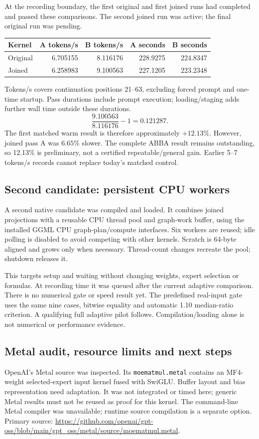 At the recording boundary, the first original and first joined runs had
completed and passed these comparisons. The second joined run was active;
the final original run was pending.
\begin{center}
\begin{tabular}{lrrrr}
\toprule
Kernel & A tokens/s & B tokens/s & A seconds & B seconds \\
\midrule
Original & 6.705155 & 8.116176 & 228.9275 & 224.8347 \\
Joined & 6.258983 & 9.100563 & 227.1205 & 223.2348 \\
\bottomrule
\end{tabular}
\end{center}
Tokens/s covers continuation positions 21--63, excluding forced prompt and
one-time startup. Pass durations include prompt execution; loading/staging
adds further wall time outside these durations.
\[
 \frac{9.100563}{8.116176}-1=0.121287.
\]
The first matched warm result is therefore approximately $+12.13\%$.
However, joined pass A was $6.65\%$ slower. The complete ABBA result remains
outstanding, so 12.13\% is preliminary, not a certified repeatable/general
gain. Earlier 5--7 tokens/s records cannot replace today's matched control.

\subsection{Second candidate: persistent CPU workers}
A second native candidate was compiled and loaded. It combines joined
projections with a reusable CPU thread pool and graph-work buffer, using
the installed GGML CPU graph-plan/compute interfaces. Six workers are reused;
idle polling is disabled to avoid competing with other kernels. Scratch
is 64-byte aligned and grows only when necessary. Thread-count changes
recreate the pool; shutdown releases it.

This targets setup and waiting without changing weights, expert selection
or formulas. At recording time it was queued after the current adaptive
comparison. There is no numerical gate or speed result yet. The predefined
real-input gate uses the same nine cases, bitwise equality and automatic
1.10 median-ratio criterion. A qualifying full adaptive pilot follows.
Compilation/loading alone is not numerical or performance evidence.

\subsection{Metal audit, resource limits and next steps}
OpenAI's Metal source was inspected. Its \texttt{moematmul.metal} contains
an MF4-weight selected-expert input kernel fused with SwiGLU. Buffer layout
and bias representation need adaptation. It was not integrated or timed
here; generic Metal results must not be reused as proof for this kernel.
The command-line Metal compiler was unavailable; runtime source compilation
is a separate option. Primary source:
\url{https://github.com/openai/gpt-oss/blob/main/gpt_oss/metal/source/moematmul.metal}.

